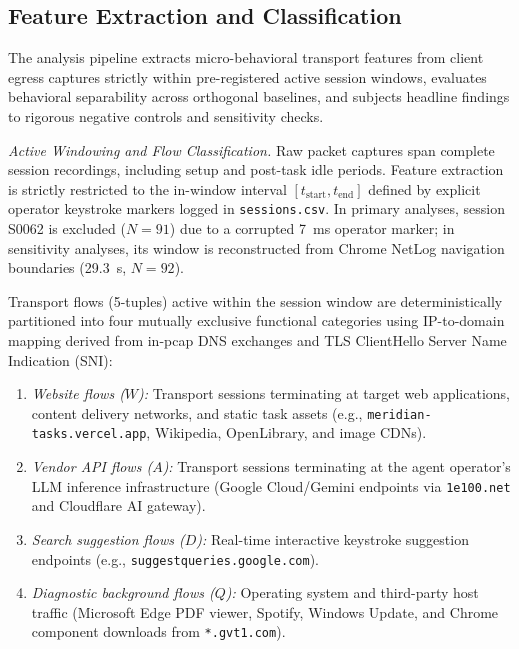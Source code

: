 \subsection{Feature Extraction and Classification}
\label{sec:feature-classification}
The analysis pipeline extracts micro-behavioral transport features from client egress captures strictly within pre-registered active session windows, evaluates behavioral separability across orthogonal baselines, and subjects headline findings to rigorous negative controls and sensitivity checks.

\textit{Active Windowing and Flow Classification.}
Raw packet captures span complete session recordings, including setup and post-task idle periods. Feature extraction is strictly restricted to the in-window interval $[t_{\text{start}}, t_{\text{end}}]$ defined by explicit operator keystroke markers logged in \texttt{sessions.csv}. In primary analyses, session S0062 is excluded ($N=91$) due to a corrupted 7~ms operator marker; in sensitivity analyses, its window is reconstructed from Chrome NetLog navigation boundaries (29.3~s, $N=92$). 

Transport flows (5-tuples) active within the session window are deterministically partitioned into four mutually exclusive functional categories using IP-to-domain mapping derived from in-pcap DNS exchanges and TLS ClientHello Server Name Indication (SNI):
\begin{enumerate}
    \item \textit{Website flows ($W$):} Transport sessions terminating at target web applications, content delivery networks, and static task assets (e.g., \texttt{meridian-tasks.vercel.app}, Wikipedia, OpenLibrary, and image CDNs).
    \item \textit{Vendor API flows ($A$):} Transport sessions terminating at the agent operator's LLM inference infrastructure (Google Cloud/Gemini endpoints via \texttt{1e100.net} and Cloudflare AI gateway).
    \item \textit{Search suggestion flows ($D$):} Real-time interactive keystroke suggestion endpoints (e.g., \texttt{suggestqueries.google.com}).
    \item \textit{Diagnostic background flows ($Q$):} Operating system and third-party host traffic (Microsoft Edge PDF viewer, Spotify, Windows Update, and Chrome component downloads from \texttt{*.gvt1.com}).
\end{enumerate}

